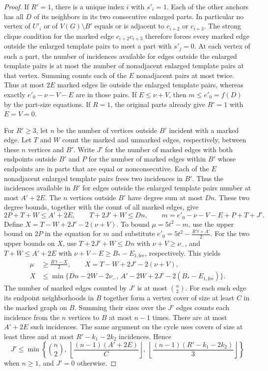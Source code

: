 \documentclass[preprint,11pt,numbers]{elsarticle-arxiv}
\numberwithin{equation}{section}
\theoremstyle{definition}
\begin{document}
\begin{proof}
If $R'=1$, there is a unique index $i$ with $s'_i=1$. Each
of the other anchors has all $D$ of its neighbors in its two
consecutive enlarged parts. In particular no vertex of $U'_i$
or of $V(G)\setminus B'$ equals or is adjacent to $c_{i+2}$
or $c_{i+3}$. The strong clique condition for the marked edge
$c_{i+2}c_{i+3}$ therefore forces every marked edge outside the
enlarged template pairs to meet a part with $s'_j=0$. At each
vertex of such a part, the number of incidences available for
edges outside the enlarged template pairs is at most the number
of nonadjacent enlarged template pairs at that vertex. Summing
counts each of the $E$ nonadjacent pairs at most twice. Thus
at most $2E$ marked edges lie outside the enlarged template
pairs, whereas exactly $e'_0-\nu-V-E$ are in those pairs.
If $E\leq\nu+V$, then $m\leq e'_0=f(D)$ by the part-size
equations. If $R=1$, the original parts already give $R'=1$
with $E=V=0$.

For $R'\geq3$, let $n$ be the number of vertices outside $B'$ incident
with a marked edge. Let $T$ and $W$ count the marked and unmarked
edges, respectively, between these $n$ vertices and $B'$. Write $J'$
for the number of marked edges with both endpoints outside $B'$ and
$P$ for the number of marked edges within $B'$ whose endpoints
are in parts that are equal or nonconsecutive. Each of the $E$
nonadjacent enlarged template pairs frees two incidences in $B'$.
Thus the incidences available in $B'$ for edges outside the
enlarged template pairs number at most $A'+2E$. The $n$ vertices
outside $B'$ have degree sum at most $Dn$. These two degree
bounds, together with the count of all marked edges, give
\[
 2P+T+W\leq A'+2E,\qquad T+2J'+W\leq Dn,\qquad
 m=e'_0-\nu-V-E+P+T+J'.
\]
Define $X=T-W+2J'-2(\nu+V)$. To bound $\mu=5t^2-m$, use the
upper bound on $2P$ in the equation for $m$ and substitute
$e'_0=5t^2-\frac{R't+A'}{2}$. For the two upper bounds on $X$,
use $T+2J'+W\leq Dn$ with $\nu+V\geq\nu_-$, and
$T+W\leq A'+2E$ with $\nu+V-E\geq B_*-E_{1,\mathrm{fee}}$,
respectively. This yields
\begin{equation}\label{eq:odd-small-excess}
 \begin{split}
 \mu&\geq \frac{R't-X}{2},\qquad X=T-W+2J'-2(\nu+V),\\
 X&\leq \min\{Dn-2W-2\nu_-,\,
          A'-2W+2J'-2(B_*-E_{1,\mathrm{fee}})\}.
 \end{split}
\end{equation}
The number of marked edges counted by $J'$ is at most
$\binom{n}{2}$. For each such edge its endpoint neighborhoods
in $B$ together form a vertex cover of size at least $C$ in the
marked graph on $B$. Summing their sizes over the $J'$ edges
counts each incidence from the $n$ vertices to $B$ at most
$n-1$ times. There are at most $A'+2E$ such incidences. The
same argument on the cycle uses covers of size at least three
and at most $R'-k_1-2k_2$ incidences. Hence
\[
 J'\leq \min\left\{\binom{n}{2},\ 
      \left\lfloor\frac{(n-1)(A'+2E)}{C}\right\rfloor,\ 
      \left\lfloor\frac{(n-1)(R'-k_1-2k_2)}{3}\right\rfloor\right\}
\]
when $n\geq1$, and $J'=0$ otherwise.


\end{proof}
\end{document}
